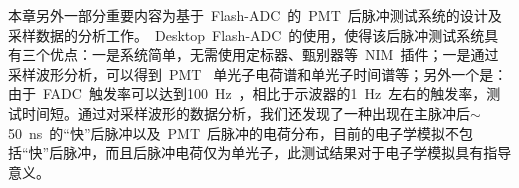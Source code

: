 本章另外一部分重要内容为基于~Flash-ADC~的~PMT~后脉冲测试系统的设计及采样数据的分析工作。~Desktop~Flash-ADC~的使用，使得该后脉冲测试系统具有三个优点：一是系统简单，无需使用定标器、甄别器等~NIM~插件；一是通过采样波形分析，可以得到~PMT~ 单光子电荷谱和单光子时间谱等；另外一个是：由于~FADC~触发率可以达到100~Hz~，相比于示波器的1~Hz~左右的触发率，测试时间短。通过对采样波形的数据分析，我们还发现了一种出现在主脉冲后$\sim$50~ns~的``快''后脉冲以及~PMT~后脉冲的电荷分布，目前的电子学模拟不包括``快''后脉冲，而且后脉冲电荷仅为单光子，此测试结果对于电子学模拟具有指导意义。
